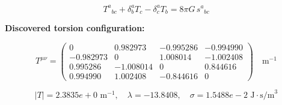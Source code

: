
\begin{equation}
  T^a{}_{bc} + \delta^a_b T_c - \delta^a_c T_b = 8\pi G \, s^a{}_{bc}
\end{equation}

\textbf{Discovered torsion configuration:}

\begin{equation}
  T^{\mu\nu} = \begin{pmatrix}
    0 & 0.982973 & -0.995286 & -0.994990 \\
    -0.982973 & 0 & 1.008014 & -1.002408 \\
    0.995286 & -1.008014 & 0 & 0.844616 \\
    0.994990 & 1.002408 & -0.844616 & 0
  \end{pmatrix} \quad \text{m}^{-1}
\end{equation}

\begin{equation}
  |T| = 2.3835e+0 \text{ m}^{-1}, \quad
  \lambda = -13.8408, \quad
  \sigma = 1.5488e-2 \text{ J}\cdot\text{s/m}^3
\end{equation}